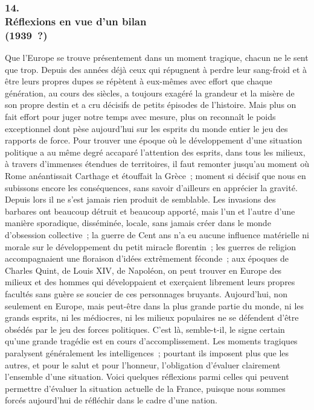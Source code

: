 \documentclass[french,twoside]{book} %
\begin{document}
\subsubsection[{14. Réflexions en vue d’un bilan, (1939 ?)}]{14. \\
Réflexions en vue d’un bilan \\
(1939 ?)}
\noindent \par
Que l'Europe se trouve présentement dans un moment tragique, chacun ne le sent que trop. Depuis des années déjà ceux qui répugnent à perdre leur sang-froid et à être leurs propres dupes se répètent à eux-mêmes avec effort que chaque génération, au cours des siècles, a toujours exagéré la grandeur et la misère de son propre destin et a cru décisifs de petits épisodes de l'histoire. Mais plus on fait effort pour juger notre temps avec mesure, plus on reconnaît le poids exceptionnel dont pèse aujourd'hui sur les esprits du monde entier le jeu des rapports de force. Pour trouver une époque où le développement d'une situation politique a au même degré accaparé l'attention des esprits, dans tous les milieux, à travers d'immenses étendues de territoires, il faut remonter jusqu'au moment où Rome anéantissait Carthage et étouffait la Grèce ; moment si décisif que nous en subissons encore les conséquences, sans savoir d'ailleurs en apprécier la gravité. Depuis lors il ne s'est jamais rien produit de semblable. Les invasions des barbares ont beaucoup détruit et beaucoup apporté, mais l'un et l'autre d'une manière sporadique, disséminée, locale, sans jamais créer dans le monde d'obsession collective ; la guerre de Cent ans n'a eu aucune influence matérielle ni morale sur le développement du petit miracle florentin ; les guerres de religion accompagnaient une floraison d'idées extrêmement féconde ; aux époques de Charles Quint, de Louis XIV, de Napoléon, on peut trouver en Europe des milieux et des hommes qui développaient et exerçaient librement leurs propres facultés sans guère se soucier de ces personnages bruyants. Aujourd'hui, non seulement en Europe, mais peut-être dans la plus grande partie du monde, ni les grands esprits, ni les médiocres, ni les milieux populaires ne se défendent d'être obsédés par le jeu des forces politiques. C'est là, semble-t-il, le signe certain qu'une grande tragédie est en cours d'accomplissement. Les moments tragiques paralysent généralement les intelligences ; pourtant ils imposent plus que les autres, et pour le salut et pour l'honneur, l'obligation d'évaluer clairement l'ensemble d'une situation. Voici quelques réflexions parmi celles qui peuvent permettre d'évaluer la situation actuelle de la France, puisque nous sommes forcés aujourd'hui de réfléchir dans le cadre d'une nation.\par
\end{document}
